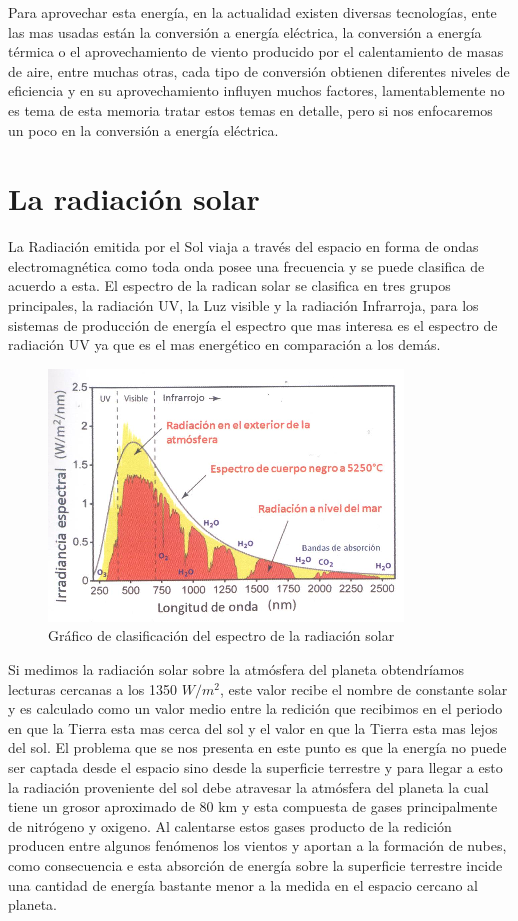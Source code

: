 Para aprovechar esta energía, en la actualidad existen diversas tecnologías, ente las mas usadas están la conversión a energía eléctrica, la conversión a energía térmica o el aprovechamiento de viento producido por el calentamiento de masas de aire, entre muchas otras, cada tipo de conversión obtienen diferentes niveles de eficiencia y en su aprovechamiento influyen muchos factores, lamentablemente no es tema de esta memoria tratar estos temas en detalle, pero si nos enfocaremos un poco en la conversión a energía eléctrica.\\

\section{La radiación solar}
La Radiación emitida por el Sol viaja a través del espacio en forma de ondas electromagnética como toda onda posee una frecuencia y se puede clasifica de acuerdo a esta. El espectro de la radican solar se clasifica en tres grupos principales, la radiación UV, la Luz visible y la radiación Infrarroja, para los sistemas de producción de energía el espectro que mas interesa es el espectro de radiación UV ya que es el mas energético en comparación a los demás.

\begin{figure}[h!]
        \centering
        \includegraphics[scale=0.4]{images/espectroSolar}
        \caption{\tiny Gráfico de clasificación del espectro de la radiación solar\cite{recursoSolar:1}}
\end{figure}

Si medimos la radiación solar sobre la atmósfera del planeta obtendríamos lecturas cercanas a los 1350 $W/{m}^{2}$, este valor recibe el nombre de constante solar y es calculado como un valor medio entre la redición que recibimos en el periodo en que la Tierra esta mas cerca del sol y el valor en que la Tierra esta mas lejos del sol. El problema que se nos presenta en este punto es que la energía no puede ser captada desde el espacio sino desde la superficie terrestre y para llegar a esto la radiación proveniente del sol debe atravesar la atmósfera del planeta la cual tiene un grosor aproximado de 80 km y esta compuesta de gases principalmente de nitrógeno y oxigeno. Al calentarse estos gases producto de la redición producen entre algunos fenómenos los vientos y aportan a la formación de nubes, como consecuencia e esta absorción de energía sobre la superficie terrestre incide una cantidad de energía bastante menor a la medida en el espacio cercano al planeta.

